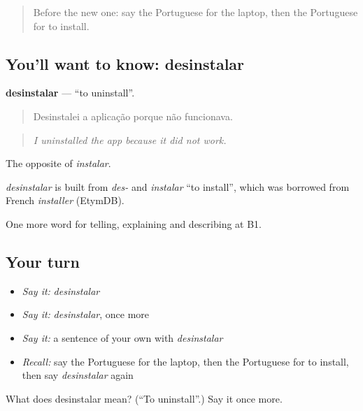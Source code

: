 \begin{quote}
Before the new one: say the Portuguese for the laptop, then the Portuguese for to install.
\end{quote}

\subsection*{You'll want to know: desinstalar}
\textbf{desinstalar} — \textquotedblleft{}to uninstall\textquotedblright{}.

\begin{quote}
Desinstalei a aplicação porque não funcionava.
\end{quote}

\begin{quote}
\emph{I uninstalled the app because it did not work.}
\end{quote}

The opposite of \emph{instalar}.

\begin{cousinweb}
\emph{desinstalar} is built from \emph{des-} and \emph{instalar} \textquotedblleft{}to install\textquotedblright{}, which was borrowed from French \emph{installer} (EtymDB).
\end{cousinweb}

\begin{grammarlens}[title={What you've built}]
One more word for telling, explaining and describing at B1.
\end{grammarlens}

\subsection*{Your turn}
\begin{itemize}
\raggedright
  \item \emph{Say it:} \emph{desinstalar}
  \item \emph{Say it:} \emph{desinstalar}, once more
  \item \emph{Say it:} a sentence of your own with \emph{desinstalar}
  \item \emph{Recall:} say the Portuguese for the laptop, then the Portuguese for to install, then say \emph{desinstalar} again
\end{itemize}

\begin{tcolorbox}[breakable,colback=teal!4,colframe=teal!35!black,title={Before you move on}]
What does desinstalar mean? (\textquotedblleft{}To uninstall\textquotedblright{}.) Say it once more.
\end{tcolorbox}
